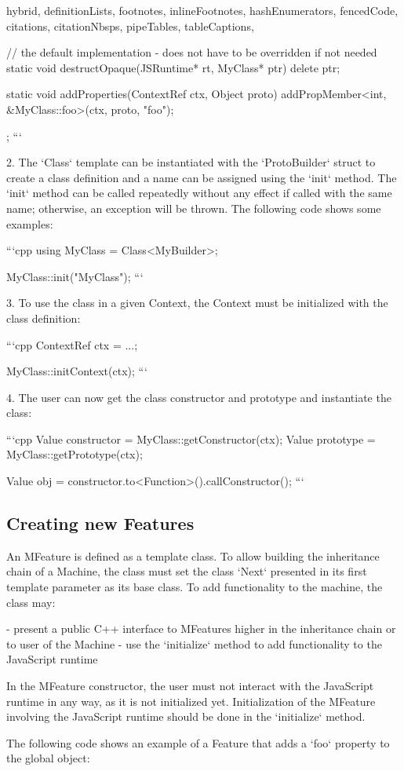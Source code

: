 \begin{markdown*}{%
  hybrid,
  definitionLists,
  footnotes,
  inlineFootnotes,
  hashEnumerators,
  fencedCode,
  citations,
  citationNbsps,
  pipeTables,
  tableCaptions,
}
{    // the default implementation - does not have to be overridden if not needed
    static void destructOpaque(JSRuntime* rt, MyClass* ptr) {
        delete ptr;
    }

    static void addProperties(ContextRef ctx, Object proto) {
        addPropMember<int, &MyClass::foo>(ctx, proto, "foo");
    }
};
```

  2. The `Class` template can be instantiated with the `ProtoBuilder` struct to create a class definition and a name can be assigned using the `init` method. The `init` method can be called repeatedly without any effect if called with the same name; otherwise, an exception will be thrown. The following code shows some examples:

```cpp
using MyClass = Class<MyBuilder>;

MyClass::init("MyClass");
```

  3. To use the class in a given Context, the Context must be initialized with the class definition:

```cpp
ContextRef ctx = ...;

MyClass::initContext(ctx);
```

  4. The user can now get the class constructor and prototype and instantiate the class:

```cpp
Value constructor = MyClass::getConstructor(ctx);
Value prototype = MyClass::getPrototype(ctx);

Value obj = constructor.to<Function>().callConstructor();
```

\subsection{Creating new Features}

An MFeature is defined as a template class. To allow building the inheritance chain of a Machine, the class must set the class `Next` presented in its first template parameter as its base class. To add functionality to the machine, the class may:

  - present a public C++ interface to MFeatures higher in the inheritance chain or to user of the Machine
  - use the `initialize` method to add functionality to the JavaScript runtime

In the MFeature constructor, the user must not interact with the JavaScript runtime in any way, as it is not initialized yet. Initialization of the MFeature involving the JavaScript runtime should be done in the `initialize` method.

The following code shows an example of a Feature that adds a `foo` property to the global object:


\end{markdown*}
